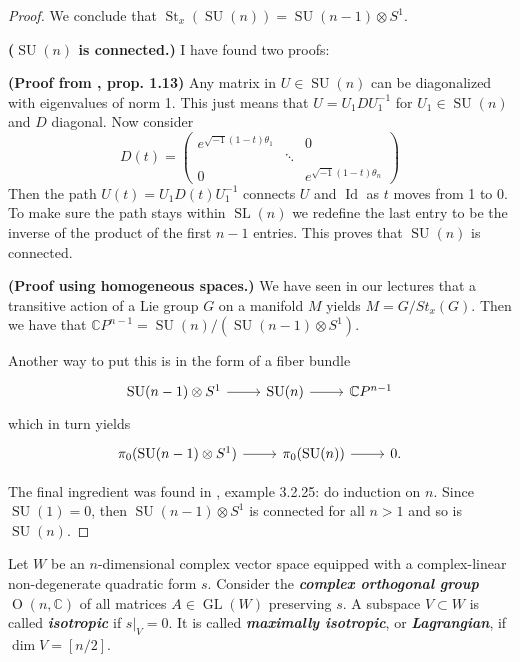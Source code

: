 \documentclass{article}
\newcommand{\C}{\mathbb{C}}
\renewcommand{\O}{\operatorname{O}}
\DeclareMathOperator{\Id}{Id}
\DeclareMathOperator{\GL}{GL}
\DeclareMathOperator{\SL}{SL}
\DeclareMathOperator{\SU}{SU}
\DeclareMathOperator{\St}{St}
\begin{document}
\begin{proof}
	We conclude that $\St_x(\SU(n))=\SU(n-1)\otimes S^1$.
	
	\textbf{($\SU(n)$ is connected.)} I have found two proofs:
	
	\textbf{(Proof from \cite{hall}, prop. 1.13)} Any matrix in $U\in\SU(n)$ can be diagonalized with eigenvalues of norm 1. This just means that $U=U_1DU_1^{-1}$ for $U_1\in\SU(n)$ and $D$ diagonal. Now consider
	\[D(t)=\begin{pmatrix}
		e^{\sqrt{-1}(1-t)\theta_1}&&0\\
		&\ddots&\\
		0&&e^{\sqrt{-1}(1-t)\theta_n}
	\end{pmatrix}\]
	Then the path $U(t)=U_1D(t)U_1^{-1}$ connects $U$ and $\Id$ as $t$ moves from 1 to 0. To make sure the path stays within $\SL(n)$ we redefine the last entry to be the inverse of the product of the first $n-1$ entries. This proves that $\SU(n)$ is connected.
	
 	\textbf{(Proof using homogeneous spaces.)} We have seen in our lectures that a transitive action of a Lie group $G$ on a manifold $M$ yields $M=G/St_x(G)$. Then we have that $\C P^{n-1}=\SU(n)/(\SU(n-1)\otimes S^1)$.
 	
 	Another way to put this is in the form of a fiber bundle
 	\[\begin{tikzcd}
 		\SU(n-1)\otimes S^1\arrow[r]&\SU(n)\arrow[r]&\C P^{n-1}
 	\end{tikzcd}\]
 	which in turn yields
 	\[\begin{tikzcd}[row sep=tiny]
 		\pi_0(\SU(n-1)\otimes S^1)\arrow[r]&\pi_0(\SU(n))\arrow[r]&0.
 	\end{tikzcd}\]
 	\iffalse and
	\[\begin{tikzcd}[row sep=tiny]
 		\pi_1(\SU(n-1)\otimes S^1)\arrow[r]&\pi_1(\SU(n))\arrow[r]&\pi_1(\C P^{n-1})=0.
 	\end{tikzcd}\]\fi
 	The final ingredient was found in \cite{piccione}, example 3.2.25: do induction on $n$. Since $\SU(1)=0$, then $\SU(n-1)\otimes S^1$ is connected for all $n>1$ and so is $\SU(n)$.
\end{proof}

\begin{defn}
	Let $W$ be an $n$-dimensional complex vector space equipped with a complex-linear non-degenerate quadratic form $s$. Consider the \textbf{\textit{complex orthogonal group}} $\O(n,\C)$ of all matrices $A \in \GL(W )$ preserving $s$. A subspace $V \subset W$ is called \textbf{\textit{isotropic}} if $s|_V = 0$. It is called \textbf{\textit{maximally isotropic}}, or \textbf{\textit{Lagrangian}}, if $\dim V = [n/2]$.
\end{defn}
\end{document}
